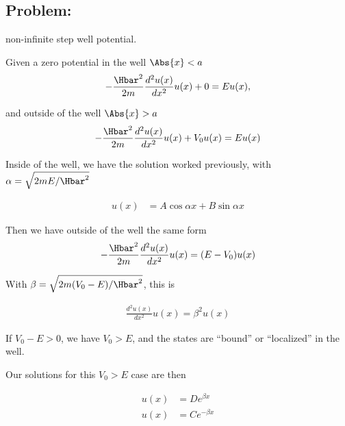 \subsection{Problem:}  non-infinite step well potential.

Given a zero potential in the well $\Abs{x} < a$
\begin{equation}\label{eqn:PHY356Lecture9:30}
\begin{aligned}
-\frac{\Hbar^2 }{2m} \frac{d^2 u(x)}{dx^2} u(x) + 0 = E u(x),
\end{aligned}
\end{equation}

and outside of the well $\Abs{x} > a$
\begin{equation}\label{eqn:PHY356Lecture9:31}
\begin{aligned}
-\frac{\Hbar^2 }{2m} \frac{d^2 u(x)}{dx^2} u(x) + V_0 u(x) = E u(x)
\end{aligned}
\end{equation}

Inside of the well, we have the solution worked previously, with $\alpha = \sqrt{2m E/\Hbar^2}$

\begin{equation}\label{eqn:PHY356Lecture9:32}
\begin{aligned}
u(x) &= A \cos\alpha x + B \sin\alpha x
\end{aligned}
\end{equation}

Then we have outside of the well the same form
\begin{equation}\label{eqn:PHY356Lecture9:33}
\begin{aligned}
-\frac{\Hbar^2 }{2m} \frac{d^2 u(x)}{dx^2} u(x) = (E - V_0 )u(x)
\end{aligned}
\end{equation}

With $\beta = \sqrt{ 2m (V_0 - E)/\Hbar^2}$, this is

\begin{equation}\label{eqn:PHY356Lecture9:34}
\begin{aligned}
\frac{d^2 u(x)}{dx^2} u(x) = \beta^2 u(x)
\end{aligned}
\end{equation}

If $V_0 - E > 0$, we have $V_0 > E$, and the states are ``bound'' or ``localized'' in the well.

Our solutions for this $V_0 > E$ case are then

\begin{equation}\label{eqn:PHY356Lecture9:35}
\begin{aligned}
u(x) &= D e^{\beta x} \\
u(x) &= C e^{-\beta x}
\end{aligned}
\end{equation}

